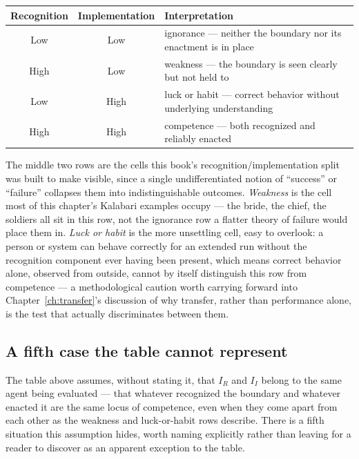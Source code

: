 \begin{center}
\begin{tabular}{c c p{7.5cm}}
\hline
\textbf{Recognition} & \textbf{Implementation} & \textbf{Interpretation} \\
\hline
Low & Low & ignorance --- neither the boundary nor its enactment is in place \\[2pt]
High & Low & weakness --- the boundary is seen clearly but not held to \\[2pt]
Low & High & luck or habit --- correct behavior without underlying understanding \\[2pt]
High & High & competence --- both recognized and reliably enacted \\
\hline
\end{tabular}
\end{center}

The middle two rows are the cells this book's recognition/implementation split was built to make visible, since a single undifferentiated notion of ``success'' or ``failure'' collapses them into indistinguishable outcomes. \emph{Weakness} is the cell most of this chapter's Kalabari examples occupy --- the bride, the chief, the soldiers all sit in this row, not the ignorance row a flatter theory of failure would place them in. \emph{Luck or habit} is the more unsettling cell, easy to overlook: a person or system can behave correctly for an extended run without the recognition component ever having been present, which means correct behavior alone, observed from outside, cannot by itself distinguish this row from competence --- a methodological caution worth carrying forward into Chapter~\ref{ch:transfer}'s discussion of why transfer, rather than performance alone, is the test that actually discriminates between them.

\subsection*{A fifth case the table cannot represent}

The table above assumes, without stating it, that $I_R$ and $I_I$ belong to the same agent being evaluated --- that whatever recognized the boundary and whatever enacted it are the same locus of competence, even when they come apart from each other as the weakness and luck-or-habit rows describe. There is a fifth situation this assumption hides, worth naming explicitly rather than leaving for a reader to discover as an apparent exception to the table.

